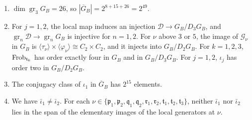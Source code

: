 \begin{lemma}\label{tw:retained-quotient}
\begin{enumerate}
\item[(a)] $\dim\operatorname{gr}_3G_B=26$, so $|\overline G_B|=2^{8+15+26}=2^{49}$.
\item[(b)] For $j=1,2$, the local map induces an injection
 $\mathcal D\to G_B/D_3G_B$, and $\operatorname{gr}_n\mathcal D\to\operatorname{gr}_nG_B$ is
 injective for $n=1,2$. For $\nu$ above $3$ or $5$, the image of
 $\mathcal G_\nu$ in $G_B$ is
 $\langle\tau_\nu\rangle\times\langle\varphi_\nu\rangle\cong C_2\times C_2$,
 and it injects into $G_B/D_2G_B$. For $k=1,2,3$, $\operatorname{Frob}_{\mathfrak t_k}$ has
 order exactly four in $G_B$ and in $G_B/D_3G_B$. For $j=1,2$, $\iota_j$ has
 order two in $G_B/D_2G_B$.
\item[(c)] The conjugacy class of $\iota_1$ in $\overline G_B$ has $2^{15}$
 elements.
\item[(d)] We have $\bar\iota_1\ne\bar\iota_2$. For each
 $\nu\in\{\mathfrak p_1,\mathfrak p_2,\mathfrak q_1,\mathfrak q_2,\mathfrak r_1,\mathfrak r_2,\mathfrak t_1,\mathfrak t_2,\mathfrak t_3\}$,
 neither $\bar\iota_1$ nor $\bar\iota_2$ lies in the span of the elementary
 images of the local generators at $\nu$.
\end{enumerate}
\end{lemma}

